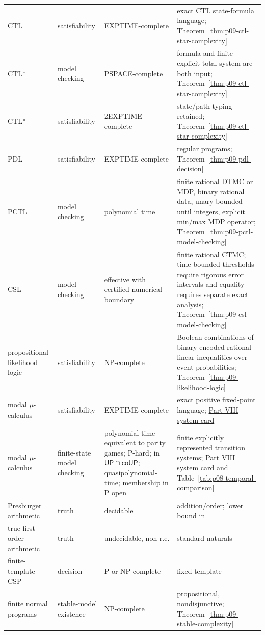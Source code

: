 \begin{longtable}{@{}p{}p{}p{}p{}@{}}
CTL & satisfiability & EXPTIME-complete & exact CTL state-formula language;
Theorem~\ref{thm:p09-ctl-star-complexity} \\
CTL* & model checking & PSPACE-complete & formula and finite explicit total
system are both input; Theorem~\ref{thm:p09-ctl-star-complexity} \\
CTL* & satisfiability & 2EXPTIME-complete & state/path typing retained;
Theorem~\ref{thm:p09-ctl-star-complexity} \\
PDL & satisfiability & EXPTIME-complete & regular programs;
Theorem~\ref{thm:p09-pdl-decision} \\
PCTL & model checking & polynomial time & finite rational DTMC or MDP,
binary rational data, unary bounded-until integers, explicit min/max MDP
operator; Theorem~\ref{thm:p09-pctl-model-checking} \\
CSL & model checking & effective with certified numerical boundary & finite
rational CTMC; time-bounded thresholds require rigorous error intervals and
equality requires separate exact analysis; Theorem~\ref{thm:p09-csl-model-checking} \\
propositional likelihood logic & satisfiability & NP-complete & Boolean
combinations of binary-encoded rational linear inequalities over event
probabilities; Theorem~\ref{thm:p09-likelihood-logic} \\
modal \(\mu\)-calculus & satisfiability & EXPTIME-complete & exact positive
fixed-point language; \hyperref[entry:p08-modal-mu]{Part VIII system card}
\cite{Kozen1983} \\
modal \(\mu\)-calculus & finite-state model checking & polynomial-time
equivalent to parity games; P-hard; in
\(\mathsf{UP}\cap\mathsf{coUP}\); quasipolynomial-time; membership in P open &
finite explicitly represented transition systems;
\hyperref[entry:p08-modal-mu]{Part VIII system card} and
Table~\ref{tab:p08-temporal-comparison}
\cite{EmersonJutla1999,CaludeJainKhoussainovLiStephan2017} \\
Presburger arithmetic & truth & decidable & addition/order; lower bound in \cite{FischerRabin1974} \\
true first-order arithmetic & truth & undecidable, non-r.e. & standard naturals \cite{Shoenfield1967} \\
finite-template CSP & decision & P or NP-complete & fixed template \cite{Zhuk2020} \\
finite normal programs & stable-model existence & NP-complete & propositional,
nondisjunctive; Theorem~\ref{thm:p09-stable-complexity} \\

\end{longtable}
